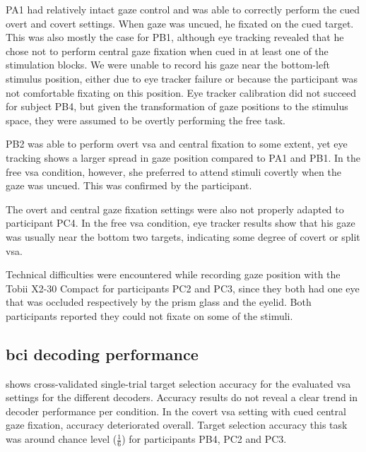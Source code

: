 \documentclass[twocolumn]{article}
\begin{document}
PA1 had relatively intact gaze control and was able to correctly perform the
cued overt and covert settings.
When gaze was uncued, he fixated on the cued target.
This was also mostly the case for PB1, although eye tracking revealed that he
chose not to perform central gaze fixation when cued in at least one of the
stimulation blocks. We were unable to record his gaze near the bottom-left
stimulus position, either due to eye tracker failure or because the participant
was not comfortable fixating on this position.
Eye tracker calibration did not succeed for subject PB4, but given the
transformation of gaze positions to the stimulus space, they were assumed to
be overtly performing the free task.

PB2 was able to perform overt \ac{vsa} and central fixation to some extent,
yet eye tracking shows a larger spread in gaze position compared to
PA1 and PB1.
In the free \ac{vsa} condition, however, she preferred to attend
stimuli covertly when the gaze was uncued.
This was confirmed by the participant.

The overt and central gaze fixation settings were also not properly adapted to
participant PC4.
In the free \ac{vsa} condition, eye tracker results show that his gaze was usually near the
bottom two targets, indicating some degree of covert or split \ac{vsa}.

Technical difficulties were encountered while recording gaze position with the
Tobii X2-30
Compact for participants PC2 and PC3, since they both had one eye that was
occluded respectively by the prism glass and the eyelid.
Both participants reported they could not fixate on some of the
stimuli.

\subsection{\Acs{bci} decoding performance}

 shows cross-validated single-trial target selection
accuracy for the evaluated \ac{vsa} settings for the different decoders.
Accuracy results do not reveal a clear trend in decoder performance per
condition.
In the covert \ac{vsa} setting with cued central gaze fixation, accuracy
deteriorated overall.
Target selection accuracy this task was around chance level ($\frac{1}{6}$) for
participants PB4, PC2 and PC3.
\end{document}
